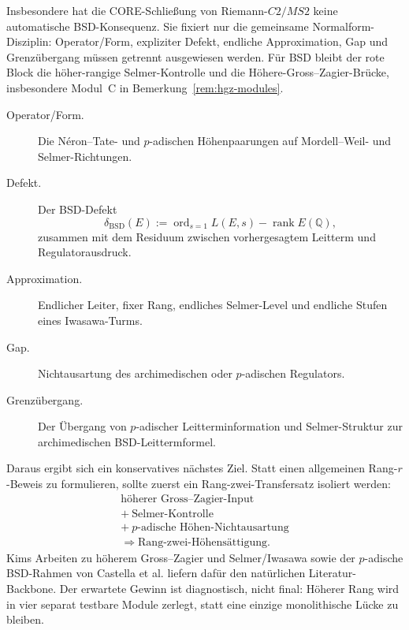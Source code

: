 \documentclass[aps,prd,twocolumn,superscriptaddress,nofootinbib,floatfix]{revtex4-2}
\theoremstyle{definition}
\theoremstyle{remark}
\begin{document}
Insbesondere hat die CORE-Schließung von Riemann-$C2/MS2$ keine
automatische BSD-Konsequenz.  Sie fixiert nur die gemeinsame
Normalform-Disziplin: Operator/Form, expliziter Defekt, endliche
Approximation, Gap und Grenzübergang müssen getrennt ausgewiesen werden.
Für BSD bleibt der rote Block die höher-rangige Selmer-Kontrolle und die
Höhere-Gross--Zagier-Brücke, insbesondere Modul~C in
Bemerkung~\ref{rem:hgz-modules}.

\begin{description}
  \item[Operator/Form.] Die Néron--Tate- und $p$-adischen Höhenpaarungen
  auf Mordell--Weil- und Selmer-Richtungen.
  \item[Defekt.] Der BSD-Defekt
  \[
    \delta_{\mathrm{BSD}}(E)
      := \operatorname{ord}_{s=1}L(E,s)-\operatorname{rank}E(\mathbb{Q}),
  \]
  zusammen mit dem Residuum zwischen vorhergesagtem Leitterm und
  Regulatorausdruck.
  \item[Approximation.] Endlicher Leiter, fixer Rang, endliches
  Selmer-Level und endliche Stufen eines Iwasawa-Turms.
  \item[Gap.] Nichtausartung des archimedischen oder $p$-adischen
  Regulators.
  \item[Grenzübergang.] Der Übergang von $p$-adischer
  Leitterminformation und Selmer-Struktur zur archimedischen
  BSD-Leittermformel.
\end{description}

Daraus ergibt sich ein konservatives nächstes Ziel.  Statt einen
allgemeinen Rang-$r$-Beweis zu formulieren, sollte zuerst ein
Rang-zwei-Transfersatz isoliert werden:
\[
\begin{gathered}
  \text{höherer Gross--Zagier-Input}\\
  +\ \text{Selmer-Kontrolle}\\
  +\ \text{$p$-adische Höhen-Nichtausartung}\\
  \Longrightarrow \text{Rang-zwei-Höhensättigung}.
\end{gathered}
\]
Kims Arbeiten zu höherem Gross--Zagier und Selmer/Iwasawa sowie der
$p$-adische BSD-Rahmen von Castella et al. liefern dafür den natürlichen
Literatur-Backbone.  Der erwartete Gewinn ist diagnostisch, nicht final:
Höherer Rang wird in vier separat testbare Module zerlegt, statt eine
einzige monolithische Lücke zu bleiben.
\end{document}
